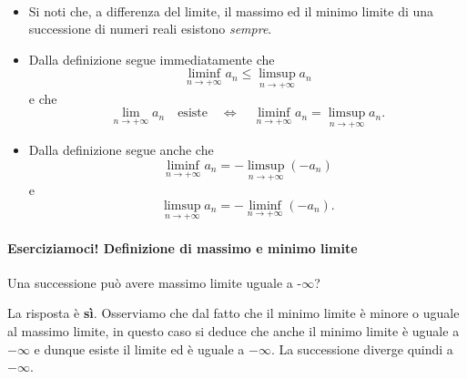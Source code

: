 \begin{observes}~
	\begin{itemize}
		\item Si noti che, a differenza del limite, il massimo ed il minimo limite di una successione di numeri reali esistono \textit{sempre}.
		\item Dalla definizione segue immediatamente che
		\begin{equation*}
			\liminf_{n\to +\infty} a_{n} \leq \limsup_{n\to +\infty} a_{n}
		\end{equation*}
		e che
		\begin{equation*}
			\lim_{n\to +\infty} a_n \quad \mbox{esiste} \quad \iff \quad \liminf_{n\to +\infty} a_{n} =\limsup_{n\to +\infty} a_{n}.
		\end{equation*}
		\item Dalla definizione segue anche che
		\begin{equation*}
			\liminf_{n\to +\infty} a_{n} = - \limsup_{n\to +\infty} (-a_{n})
		\end{equation*}
	e
	\begin{equation*}
		\limsup_{n\to +\infty} a_{n} = - \liminf_{n\to +\infty} (-a_{n}).
	\end{equation*}
	\end{itemize}
\end{observes}
\paragraph{Eserciziamoci! Definizione di massimo e minimo limite}
\begin{example}
	Una successione può avere massimo limite uguale a -$\infty$?
\end{example}
\begin{solution}
	La risposta è \textbf{sì}. Osserviamo che dal fatto che il minimo limite è minore o uguale al massimo limite, in questo caso si deduce che anche il minimo limite è uguale a $-\infty$ e dunque esiste il limite ed è uguale a $-\infty$. La successione diverge quindi a $-\infty$.
\end{solution}
